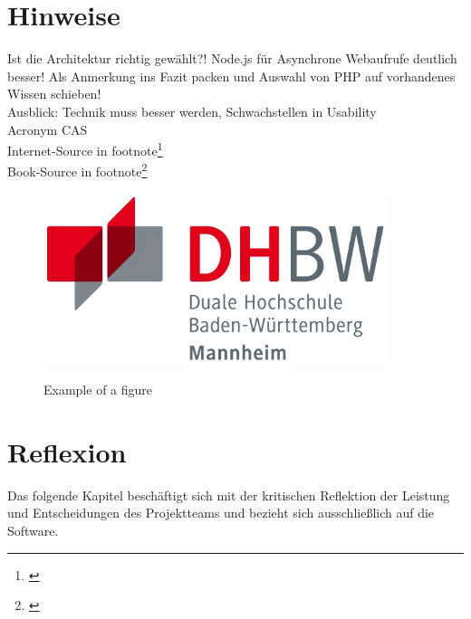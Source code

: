 \chapter{Hinweise}

Ist die Architektur richtig gewählt?! Node.js für Asynchrone Webaufrufe deutlich besser! Als Anmerkung ins Fazit packen und Auswahl von PHP auf vorhandenes Wissen  schieben!\\

Ausblick: Technik muss besser werden, Schwachstellen in Usability\\

Acronym \acf{CAS}\\

Internet-Source in footnote\footnote{\citep{cas}}\\

Book-Source in footnote\footnote{\citep{einfuehung_sap_hana}}\\

\begin{figure}[H]
	\centering
	{\includegraphics[height=5cm]{Bilder/logo_dhbw_ma.jpg}}
	\caption{Example of a figure \protect\citep[page 32]{cas}}
	\label{fig:Example}
\end{figure}

\chapter{Reflexion}
Das folgende Kapitel beschäftigt sich mit der kritischen Reflektion der Leistung und Entscheidungen des Projektteams und bezieht sich ausschließlich auf die Software.\\


